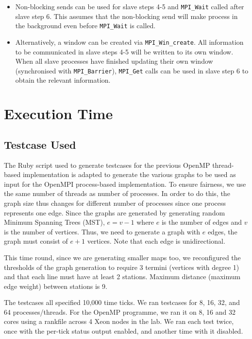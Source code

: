 \documentclass[a4paper,12pt]{article}
\begin{document}
\begin{itemize}
	      \begin{itemize}
		      \item Non-blocking sends can be used for slave steps 4-5 and \texttt{MPI_Wait} called after slave step 6. This assumes that the non-blocking send will make process in the background even before \texttt{MPI_Wait} is called.
		      \item Alternatively, a window can be created via \texttt{MPI_Win_create}. All information to be communicated in slave steps 4-5 will be written to its own window. When all slave processes have finished updating their own window (synchronised with \texttt{MPI_Barrier}), \texttt{MPI_Get} calls can be used in slave step 6 to obtain the relevant information.
	      \end{itemize}
\end{itemize}

\section{Execution Time}

\subsection{Testcase Used}
The Ruby script used to generate testcases for the previous OpenMP thread-based implementation is adapted to generate the various graphs to be used as input for the OpenMPI process-based implementation. To ensure fairness, we use the same number of threads as number of processes. In order to do this, the graph size thus changes for different number of processes since one process represents one edge. Since the graphs are generated by generating random Minimum Spanning Trees (MST), $e = v - 1$ where $e$ is the number of edges and $v$ is the number of vertices. Thus, we need to generate a graph with $e$ edges, the graph must consist of $e+1$ vertices. Note that each edge is unidirectional.

This time round, since we are generating smaller maps too, we reconfigured the thresholds of the graph generation to require 3 termini (vertices with degree 1) and that each line must have at least 2 stations. Maximum distance (maximum edge weight) between stations is 9.

The testcases all specified 10,000 time ticks. We ran testcases for 8, 16, 32, and 64 processes/threads. For the OpenMP programme, we ran it on 8, 16 and 32 cores using a rankfile across 4 Xeon nodes in the lab. We ran each test twice, once with the per-tick status output enabled, and another time with it disabled.
\end{document}
